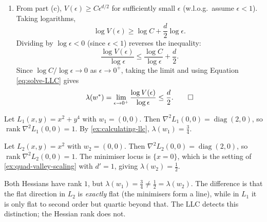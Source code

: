 \documentclass[11pt]{article}
\begin{document}
\begin{solution}
\begin{enumerate}
    \item 
        From part (c), $V(\epsilon) \geq C\epsilon^{d/2}$ for sufficiently small $\epsilon$ (w.l.o.g.\ assume $\epsilon < 1$). Taking logarithms,
        \begin{equation*}
            \log V(\epsilon) \geq \log C + \frac{d}{2}\log \epsilon.
        \end{equation*}
        Dividing by $\log \epsilon < 0$ (since $\epsilon < 1$) reverses the inequality:
        \begin{equation*}
            \frac{\log V(\epsilon)}{\log \epsilon} \leq \frac{\log C}{\log \epsilon} + \frac{d}{2}.
        \end{equation*}
        Since $\log C / \log \epsilon \to 0$ as $\epsilon \to 0^+$, taking the limit and using Equation \eqref{eq:solve-LLC} gives
        \begin{equation*}
            \lambda(w^*) = \lim_{\epsilon \to 0^+} \frac{\log V(\epsilon)}{\log \epsilon} \leq \frac{d}{2}. \qedhere
        \end{equation*}
\end{enumerate}
\end{solution}

\begin{solution}

    Let $L_1(x,y) = x^2+y^4$ with $w_1 = (0,0)$. Then $\nabla^2L_1(0,0) = \operatorname{diag}(2, 0)$, so $\operatorname{rank}\nabla^2L_1(0,0) = 1$. By \cref{ex:calculating-llc}, $\lambda(w_1) = \frac{3}{4}$.

    Let $L_2(x,y) = x^2$ with $w_2 = (0,0)$. Then $\nabla^2L_2(0,0) = \operatorname{diag}(2, 0)$, so $\operatorname{rank}\nabla^2L_2(0,0) = 1$. The minimiser locus is $\{x = 0\}$, which is the setting of \cref{ex:quad-valley-scaling} with $d' = 1$, giving $\lambda(w_2) = \frac{1}{2}$.

    Both Hessians have rank $1$, but $\lambda(w_1) = \frac{3}{4} \neq \frac{1}{2} = \lambda(w_2)$. The difference is that the flat direction in $L_2$ is \emph{exactly} flat (the minimisers form a line), while in $L_1$ it is only flat to second order but quartic beyond that. The LLC detects this distinction; the Hessian rank does not.
\end{solution}
\end{document}
